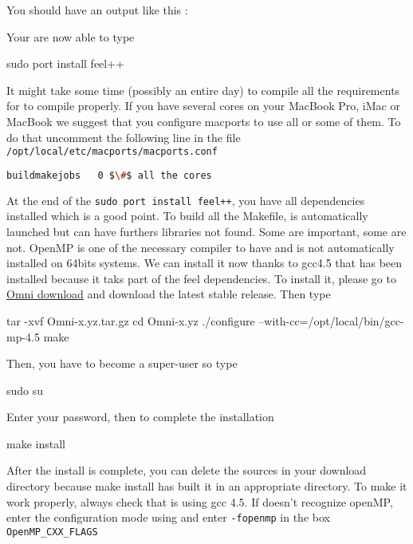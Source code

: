 You should have an output like this :
\begin{flushleft}
\end{flushleft}
Your are now able to type
\begin{unixcom}
		sudo port install feel++
\end{unixcom}
It might take some time (possibly an entire day) to compile all the requirements for \feel
to compile properly. If you have several cores on your MacBook Pro, iMac or MacBook
we suggest that you configure macports to use all or some of them.
To do that uncomment the following line in the file  \lstinline|/opt/local/etc/macports/macports.conf|
\begin{flushleft}
\begin{lstlisting}[language=sh]
buildmakejobs	0 $\#$ all the cores
\end{lstlisting}
\end{flushleft}
At the end of the \lstinline|sudo port install feel++|, you have all dependencies installed which is a good point. To build all the Makefile, \cmake is automatically launched but can have furthers libraries not found. Some are important, some are not. OpenMP is one of the necessary compiler to have and is not automatically installed on 64bits systems. We can install it now thanks to gcc4.5 that has been installed because it taks part of the feel dependencies. To install it, please go to \href{http://www.hpcs.cs.tsukuba.ac.jp/omni-openmp/download/download-omni.html}{Omni download} and download the latest stable release. Then type
\begin{unixcom}
		tar -xvf Omni-x.yz.tar.gz
		cd  Omni-x.yz
		./configure --with-cc=/opt/local/bin/gcc-mp-4.5
		make
\end{unixcom}
Then, you have to become a super-user so type
\begin{unixcom}
		sudo su
\end{unixcom}
Enter your password, then to complete the installation
\begin{unixcom}
		make install
\end{unixcom}
After the install is complete, you can delete the sources in your download directory because make install has built it in an appropriate directory. To make it work properly, always check that \cmake is using gcc 4.5. If \cmake doesn't recognize openMP, enter the configuration mode using \ccmake and enter \lstinline|-fopenmp| in the box \lstinline|OpenMP_CXX_FLAGS|

